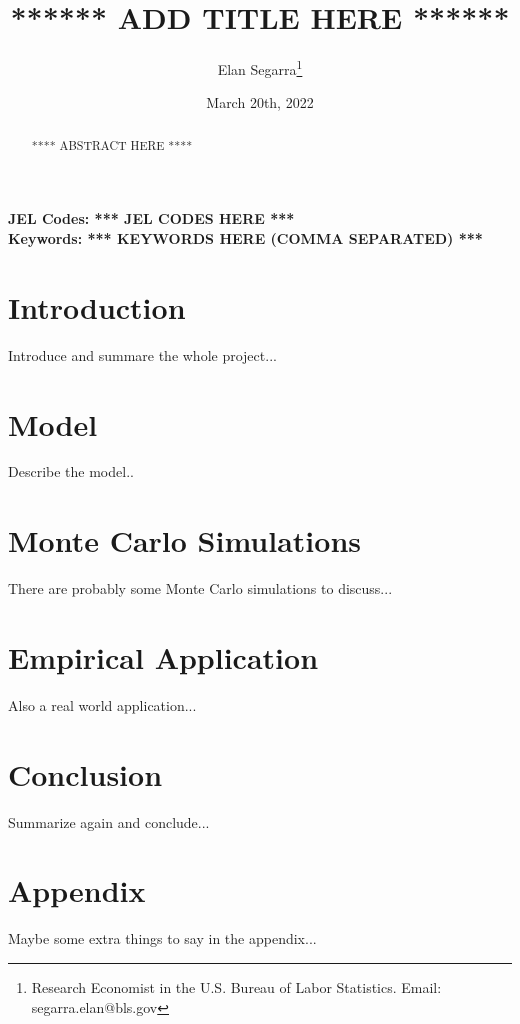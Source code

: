 \documentclass[11pt, letterpaper]{article}
\begin{document}
	
\begin{titlepage}

\title{****** ADD TITLE HERE ******}
\author{Elan Segarra\footnote{Research Economist in the U.S. Bureau of Labor Statistics. Email: segarra.elan@bls.gov}}
\date{March 20th, 2022}
\maketitle

\begin{center}
	\href{html_to_most_recent_draft}{\color{cyan}{Link to most recent version}}
\end{center}

\bigskip

\begin{abstract}
	**** ABSTRACT HERE ****
\end{abstract}

\vfill
\noindent\small{\textbf{JEL Codes: *** JEL CODES HERE ***}}\\
\small{\textbf{Keywords: *** KEYWORDS HERE (COMMA SEPARATED) *** }}


\end{titlepage}

\newpage

\section{Introduction}\label{sec:intro}

Introduce and summare the whole project...
 
\section{Model}\label{sec:model}
Describe the model..

\section{Monte Carlo Simulations}\label{sec:mc_sims}
There are probably some Monte Carlo simulations to discuss...

\section{Empirical Application}\label{sec:application}
Also a real world application...

\section{Conclusion}\label{sec:conclusion}
Summarize again and conclude...

\pagebreak


\pagebreak
\appendix
\section{Appendix}\label{sec:appendix}
Maybe some extra things to say in the appendix...
\end{document}
